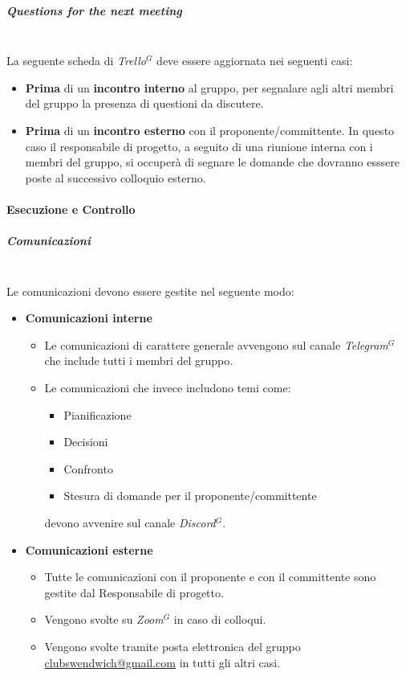 \subparagraph{Questions for the next meeting}
\mbox{}\\
La seguente scheda di \textit{Trello}$^G$ deve essere aggiornata nei seguenti casi:
\begin{itemize}
    \item \textbf{Prima} di un \textbf{incontro interno} al gruppo, per segnalare agli altri membri del gruppo
    la presenza di questioni da discutere.
    \item \textbf{Prima} di un \textbf{incontro esterno} con il proponente/committente. In questo caso il responsabile
    di progetto, a seguito di una riunione interna con i membri del gruppo, si occuperà di segnare le
    domande che dovranno esssere poste al successivo colloquio esterno.
\end{itemize}

\paragraph{Esecuzione e Controllo}

\subparagraph{Comunicazioni}
\mbox{}\\

Le comunicazioni devono essere gestite nel seguente modo:
\begin{itemize}
    \item \textbf{Comunicazioni interne}
    \begin{itemize}
        \item Le comunicazioni di carattere generale avvengono sul canale \textit{Telegram}$^{G}$
        che include tutti i membri del gruppo.
        \item Le comunicazioni che invece includono temi come:
        \begin{itemize}
            \item Pianificazione
            \item Decisioni
            \item Confronto
            \item Stesura di domande per il proponente/committente
        \end{itemize}
        devono avvenire sul canale \textit{Discord}$^{G}$.
    \end{itemize}
    \item \textbf{Comunicazioni esterne}
    \begin{itemize}
        \item Tutte le comunicazioni con il proponente e con il committente sono gestite dal Responsabile di progetto.
        \item Vengono svolte su \textit{Zoom}$^{G}$ in caso di colloqui.
        \item Vengono svolte tramite posta elettronica del gruppo \href{mailto:clubswendwich@gmail.com}{clubswendwich@gmail.com} in tutti gli altri casi.
    \end{itemize}
\end{itemize}


